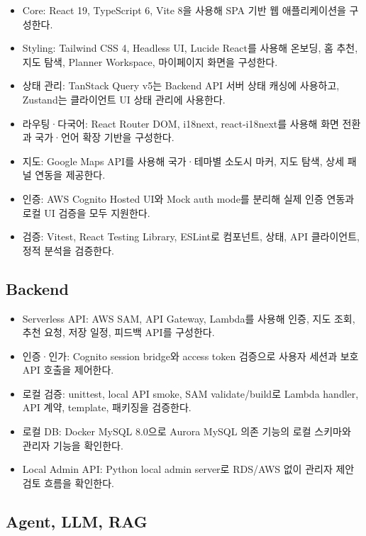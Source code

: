 \documentclass[12pt,a4paper]{article}
\newcommand{\DocNeedspace}[1]{\par\ifdim\dimexpr\pagegoal-\pagetotal\relax<#1\newpage\fi}
\begin{document}
\begin{itemize}
\item Core: React 19, TypeScript 6, Vite 8을 사용해 SPA 기반 웹 애플리케이션을 구성한다.
\item Styling: Tailwind CSS 4, Headless UI, Lucide React를 사용해 온보딩, 홈 추천, 지도 탐색, Planner Workspace, 마이페이지 화면을 구성한다.
\item 상태 관리: TanStack Query v5는 Backend API 서버 상태 캐싱에 사용하고, Zustand는 클라이언트 UI 상태 관리에 사용한다.
\item 라우팅·다국어: React Router DOM, i18next, react-i18next를 사용해 화면 전환과 국가·언어 확장 기반을 구성한다.
\item 지도: Google Maps API를 사용해 국가·테마별 소도시 마커, 지도 탐색, 상세 패널 연동을 제공한다.
\item 인증: AWS Cognito Hosted UI와 Mock auth mode를 분리해 실제 인증 연동과 로컬 UI 검증을 모두 지원한다.
\item 검증: Vitest, React Testing Library, ESLint로 컴포넌트, 상태, API 클라이언트, 정적 분석을 검증한다.
\end{itemize}


\DocNeedspace{24\baselineskip}
\subsection*{Backend}


\begin{itemize}
\item Serverless API: AWS SAM, API Gateway, Lambda를 사용해 인증, 지도 조회, 추천 요청, 저장 일정, 피드백 API를 구성한다.
\item 인증·인가: Cognito session bridge와 access token 검증으로 사용자 세션과 보호 API 호출을 제어한다.
\item 로컬 검증: unittest, local API smoke, SAM validate/build로 Lambda handler, API 계약, template, 패키징을 검증한다.
\item 로컬 DB: Docker MySQL 8.0으로 Aurora MySQL 의존 기능의 로컬 스키마와 관리자 기능을 확인한다.
\item Local Admin API: Python local admin server로 RDS/AWS 없이 관리자 제안 검토 흐름을 확인한다.
\end{itemize}


\DocNeedspace{24\baselineskip}
\subsection*{Agent, LLM, RAG}
\end{document}
